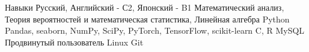 \begin{rubric}{Навыки}
\entry*[Языки]
	Русский, Английский - С2, Японский - B1
\entry*[Математика]
    Математический анализ, Теория вероятностей и математическая статистика, Линейная алгебра
	Python
        \newline Pandas, seaborn, NumPy, SciPy, PyTorch, TensorFlow, scikit-learn
        \newline C, R
	MySQL
\entry*[Другое]
	Продвинутый пользователь Linux
    \newline Git
\end{rubric}
